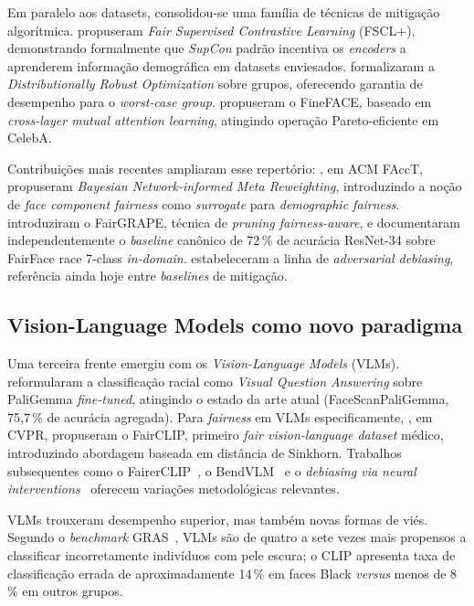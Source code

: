 Em paralelo aos datasets, consolidou-se uma família de técnicas de mitigação algorítmica.  propuseram \emph{Fair Supervised Contrastive Learning} (FSCL+), demonstrando formalmente que \emph{SupCon} padrão incentiva os \emph{encoders} a aprenderem informação demográfica em datasets enviesados.  formalizaram a \emph{Distributionally Robust Optimization} sobre grupos, oferecendo garantia de desempenho para o \emph{worst-case group}.  propuseram o FineFACE, baseado em \emph{cross-layer mutual attention learning}, atingindo operação Pareto-eficiente em CelebA.

Contribuições mais recentes ampliaram esse repertório: , em ACM FAccT, propuseram \emph{Bayesian Network-informed Meta Reweighting}, introduzindo a noção de \emph{face component fairness} como \emph{surrogate} para \emph{demographic fairness}.  introduziram o FairGRAPE, técnica de \emph{pruning fairness-aware}, e documentaram independentemente o \emph{baseline} canônico de 72\,\% de acurácia ResNet-34 sobre FairFace race 7-class \emph{in-domain}.  estabeleceram a linha de \emph{adversarial debiasing}, referência ainda hoje entre \emph{baselines} de mitigação.

\subsection{Vision-Language Models como novo paradigma}
\label{sec:rl_vlm}

Uma terceira frente emergiu com os \emph{Vision-Language Models} (VLMs).  reformularam a classificação racial como \emph{Visual Question Answering} sobre PaliGemma \emph{fine-tuned}, atingindo o estado da arte atual (FaceScanPaliGemma, 75,7\,\% de acurácia agregada). Para \emph{fairness} em VLMs especificamente, , em CVPR, propuseram o FairCLIP, primeiro \emph{fair vision-language dataset} médico, introduzindo abordagem baseada em distância de Sinkhorn. Trabalhos subsequentes como o FairerCLIP~\cite{dehdashtian2024fairerclip}, o BendVLM~\cite{gerych2024bendvlm} e o \emph{debiasing via neural interventions}~\cite{debiasing2025debiasing} oferecem variações metodológicas relevantes.

VLMs trouxeram desempenho superior, mas também novas formas de viés. Segundo o \emph{benchmark} GRAS~\cite{malik2025ask}, VLMs são de quatro a sete vezes mais propensos a classificar incorretamente indivíduos com pele escura; o CLIP apresenta taxa de classificação errada de aproximadamente 14\,\% em faces Black \emph{versus} menos de 8\,\% em outros grupos.

